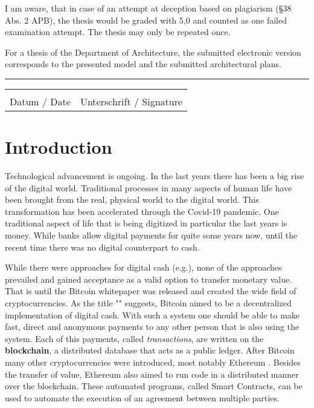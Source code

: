\documentclass{cacthesis}
\begin{document}
	I am aware, that in case of an attempt at deception based on plagiarism (§38 Abs. 2 APB), the thesis would be graded with 5,0 and counted as one failed examination attempt. The thesis may only be repeated once.
	
	For a thesis of the Department of Architecture, the submitted electronic version corresponds to the presented model and the submitted architectural plans.
	
	\vspace{10pt}
	\hrule
	\vspace{70pt}
	
	\noindent\begin{tabular}{l@{\hskip 1in}l}
		\makebox[1.8in]{\hrulefill} & \makebox[3.5in]{\hrulefill}\\
		Datum / Date & Unterschrift / Signature
	\end{tabular}
	
	\listoffigures
	\listoftables
	\tableofcontents
	
	\mainmatter
	
	\chapter{Introduction}
	Technological advancement is ongoing. In the last years there has been a big rise of the digital world.  Traditional processes in many aspects of human life have been brought from the real, physical world to the digital world. This transformation has been accelerated through the Covid-19 pandemic. One traditional aspect of life that is being digitized in particular the last years is money. While banks allow digital payments for quite some years now, until the recent time there was no digital counterpart to cash. \newline%
	
	While there were approaches for digital cash (e.g.\cite{chaum_83}), none of the approaches prevailed and gained acceptance as a valid option to transfer monetary value. That is until the Bitcoin whitepaper \cite{nakamoto_bitcoin_nodate} was released and created the wide field of cryptocurrencies. As the title "" suggests, Bitcoin aimed to be a decentralized implementation of digital cash. With such a system one should be able to make fast, direct and anonymous payments to any other person that is also using the system. Each of this payments, called \emph{transactions}, are written on the \textbf{blockchain}, a distributed database that acts as a public ledger. After Bitcoin many other cryptocurrencies were introduced, most notably Ethereum \cite{buterin_ethereum_nodate}. Besides the transfer of value, Ethereum also aimed to run code in a distributed manner over the blockchain. These automated programs, called Smart Contracts, can be used to automate the execution of an agreement between multiple parties.\newline
	
\end{document}
